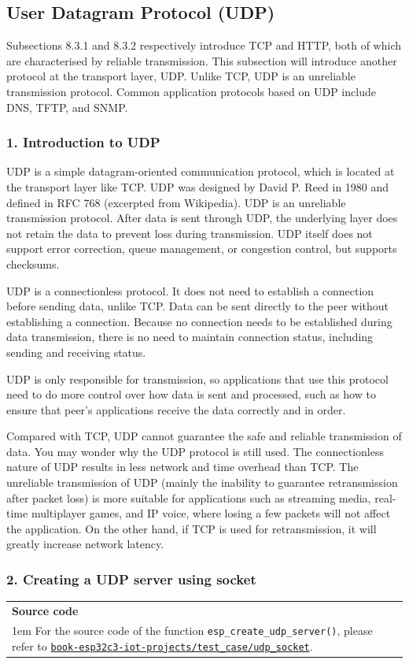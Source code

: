 \documentclass[a4paper,12pt,openany]{book}
\newcommand{\note}[2][NOTE]{ %
\vspace{6pt}
\begin{tabular}{b{\textwidth}}
\hline
\fontfamily{phv}\selectfont \textbf{#1}\\
\leftskip 1em #2\\
\hline
\end{tabular}
}
\begin{document}
\subsection{User Datagram Protocol (UDP)}
Subsections 8.3.1 and 8.3.2 respectively introduce TCP and HTTP, both of which are characterised by reliable transmission. This subsection will introduce another protocol at the transport layer, UDP. Unlike TCP, UDP is an unreliable transmission protocol. Common application protocols based on UDP include DNS, TFTP, and SNMP.

\subsubsection{1. Introduction to UDP}
UDP is a simple datagram-oriented communication protocol, which is located at the transport layer like TCP. UDP was designed by David P. Reed in 1980 and defined in RFC 768 (excerpted from Wikipedia). UDP is an unreliable transmission protocol. After data is sent through UDP, the underlying layer does not retain the data to prevent loss during transmission. UDP itself does not support error correction, queue management, or congestion control, but supports checksums.

UDP is a connectionless protocol. It does not need to establish a connection before sending data, unlike TCP. Data can be sent directly to the peer without establishing a connection. Because no connection needs to be established during data transmission, there is no need to maintain connection status, including sending and receiving status.

UDP is only responsible for transmission, so applications that use this protocol need to do more control over how data is sent and processed, such as how to ensure that peer’s applications receive the data correctly and in order.

Compared with TCP, UDP cannot guarantee the safe and reliable transmission of data. You may wonder why the UDP protocol is still used. The connectionless nature of UDP results in less network and time overhead than TCP. The unreliable transmission of UDP (mainly the inability to guarantee retransmission after packet loss) is more suitable for applications such as streaming media, real-time multiplayer games, and IP voice, where losing a few packets will not affect the application. On the other hand, if TCP is used for retransmission, it will greatly increase network latency.

\subsubsection{2. Creating a UDP server using socket}
\note[Source code]{For the source code of the function \texttt{esp\_create\_udp\_server()}, please refer to \href{https://github.com/espressif/book-esp32c3-iot-projects/tree/main/test_case/udp_socket}{\texttt{book-\newline esp32c3-iot-projects/test\_case/udp\_socket}}.}
\end{document}
